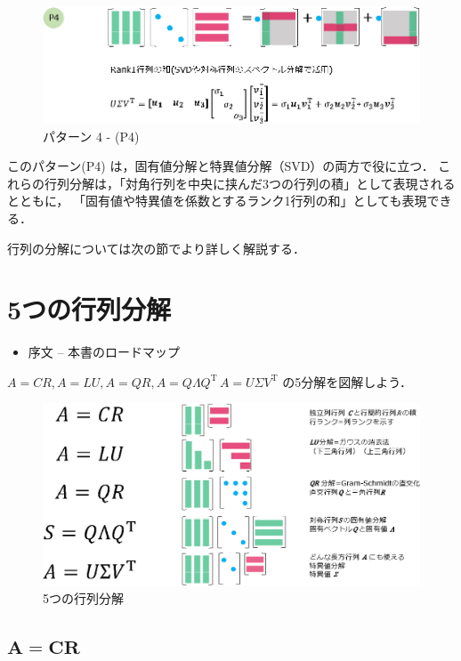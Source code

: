 \documentclass[letterpaper]{article}
\DeclareRobustCommand\transp{^{\mathrm{T}}}
\begin{document}
\begin{figure}[H]
  \includegraphics[keepaspectratio, width=\linewidth]{Pattern4-j.eps}
  \caption{パターン 4 - (P4)}
\end{figure}

このパターン(P4) は，固有値分解と特異値分解（SVD）の両方で役に立つ．
これらの行列分解は，「対角行列を中央に挟んだ3つの行列の積」として表現されるとともに，
「固有値や特異値を係数とするランク1行列の和」としても表現できる．

行列の分解については次の節でより詳しく解説する．

\section{5つの行列分解}

\begin{itemize}
  \item 序文  -- 本書のロードマップ
\end{itemize}
$A=CR, A=LU, A=QR, A=Q \Lambda Q\transp\, A=U \Sigma V\transp$ の5分解を図解しよう．

\begin{figure}[H]
  \includegraphics[keepaspectratio, width=\linewidth]{5-Factorizations-j.eps}
  \caption{5つの行列分解}
\end{figure}

\clearpage

\subsection{$\boldsymbol{A=CR}$}
\end{document}
